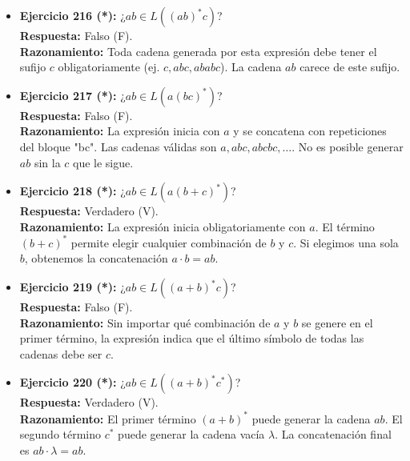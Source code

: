 \documentclass[12pt]{article}
\begin{document}
\begin{itemize}
    \vspace{0.2cm}
    \item \textbf{Ejercicio 216 (*):} ¿$ab \in L((ab)^*c)$? \\
    \textbf{Respuesta:} Falso (F). \\
    \textbf{Razonamiento:} Toda cadena generada por esta expresión debe tener el sufijo $c$ obligatoriamente (ej. $c, abc, ababc$). La cadena $ab$ carece de este sufijo.
    
    \vspace{0.2cm}
    \item \textbf{Ejercicio 217 (*):} ¿$ab \in L(a(bc)^*)$? \\
    \textbf{Respuesta:} Falso (F). \\
    \textbf{Razonamiento:} La expresión inicia con $a$ y se concatena con repeticiones del bloque "bc". Las cadenas válidas son $a, abc, abcbc, \dots$. No es posible generar $ab$ sin la $c$ que le sigue.
    
    \vspace{0.2cm}
    \item \textbf{Ejercicio 218 (*):} ¿$ab \in L(a(b+c)^*)$? \\
    \textbf{Respuesta:} Verdadero (V). \\
    \textbf{Razonamiento:} La expresión inicia obligatoriamente con $a$. El término $(b+c)^*$ permite elegir cualquier combinación de $b$ y $c$. Si elegimos una sola $b$, obtenemos la concatenación $a \cdot b = ab$.
    
    \vspace{0.2cm}
    \item \textbf{Ejercicio 219 (*):} ¿$ab \in L((a+b)^*c)$? \\
    \textbf{Respuesta:} Falso (F). \\
    \textbf{Razonamiento:} Sin importar qué combinación de $a$ y $b$ se genere en el primer término, la expresión indica que el último símbolo de todas las cadenas debe ser $c$.
    
    \vspace{0.2cm}
    \item \textbf{Ejercicio 220 (*):} ¿$ab \in L((a+b)^*c^*)$? \\
    \textbf{Respuesta:} Verdadero (V). \\
    \textbf{Razonamiento:} El primer término $(a+b)^*$ puede generar la cadena $ab$. El segundo término $c^*$ puede generar la cadena vacía $\lambda$. La concatenación final es $ab \cdot \lambda = ab$.
    

\end{itemize}
\end{document}
